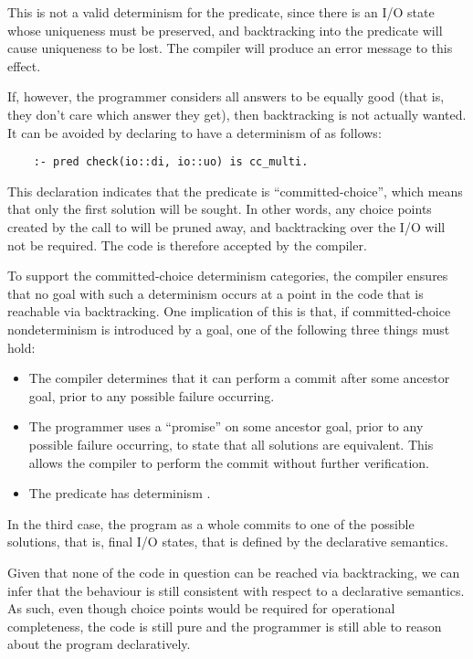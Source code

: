 This is not a valid determinism for the predicate,
since there is an I/O state whose uniqueness must be preserved,
and backtracking into the predicate
will cause uniqueness to be lost.
The compiler will produce an error message to this effect.

If, however,
the programmer considers all answers to be equally good
(that is, they don't care which answer they get),
then backtracking is not actually wanted.
It can be avoided by declaring 
to have a determinism of  as follows:
\begin{verbatim}
    :- pred check(io::di, io::uo) is cc_multi.
\end{verbatim}
This declaration indicates that the predicate is ``committed-choice'',
which means that only the first solution will be sought.
In other words,
any choice points created by the call to  will be pruned away,
and backtracking over the I/O will not be required.
The code is therefore accepted by the compiler.

To support the committed-choice determinism categories,
the compiler ensures that
no goal with such a determinism
occurs at a point in the code that is reachable via backtracking.
One implication of this is that,
if committed-choice nondeterminism is introduced by a goal,
one of the following three things must hold:
\begin{itemize}
\item
The compiler determines that it can perform a commit
after some ancestor goal,
prior to any possible failure occurring.
\item
The programmer uses a ``promise'' on some ancestor goal,
prior to any possible failure occurring,
to state that all solutions are equivalent.
This allows the compiler to perform the commit
without further verification.
\item
The  predicate has determinism .
\end{itemize}
In the third case,
the program as a whole commits to one of the possible solutions,
that is, final I/O states,
that is defined by the declarative semantics.

Given that none of the code in question
can be reached via backtracking,
we can infer that
the behaviour is still consistent
with respect to a declarative semantics.
As such,
even though choice points would be required
for operational completeness,
the code is still pure and
the programmer is still able to
reason about the program declaratively.

